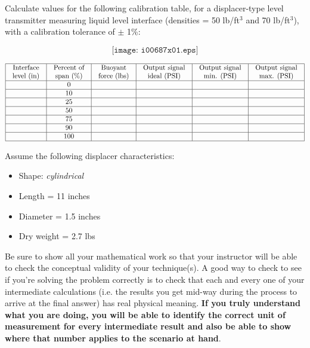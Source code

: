 

Calculate values for the following calibration table, for a displacer-type level transmitter measuring liquid level interface (densities = 50 lb/ft$^{3}$ and 70 lb/ft$^{3}$), with a calibration tolerance of $\pm$ 1\%:

$$\texttt{[image: i00687x01.eps]}$$


$$\vbox{\offinterlineskip
\halign{\strut
\vrule \quad\hfil # \ \hfil & 
\vrule \quad\hfil # \ \hfil & 
\vrule \quad\hfil # \ \hfil & 
\vrule \quad\hfil # \ \hfil & 
\vrule \quad\hfil # \ \hfil & 
\vrule \quad\hfil # \ \hfil \vrule \cr
\noalign{\hrule}
%
Interface & Percent of & Buoyant & Output signal & Output signal & Output signal \cr
%
level (in) & span (\%) & force (lbs) & ideal (PSI) & min. (PSI) & max. (PSI) \cr
%
\noalign{\hrule}
%
  & 0 &  &  &  &  \cr
%
\noalign{\hrule}
%
  & 10 &  &  &  &  \cr
%
\noalign{\hrule}
%
  & 25 &  &  &  &  \cr
%
\noalign{\hrule}
%
  & 50 &  &  &  &  \cr
%
\noalign{\hrule}
%
  & 75 &  &  &  &  \cr
%
\noalign{\hrule}
%
  & 90 &  &  &  &  \cr
%
\noalign{\hrule}
%
  & 100 &  &  &  &  \cr
%
\noalign{\hrule}
} %
}$$ %

Assume the following displacer characteristics:

\begin{itemize}
\item{} Shape: {\it cylindrical}
\item{} Length = 11 inches
\item{} Diameter = 1.5 inches
\item{} Dry weight = 2.7 lbs
\end{itemize}

\vskip 10pt

Be sure to show all your mathematical work so that your instructor will be able to check the conceptual validity of your technique(s).  A good way to check to see if you're solving the problem correctly is to check that each and every one of your intermediate calculations (i.e. the results you get mid-way during the process to arrive at the final answer) has real physical meaning.  {\bf If you truly understand what you are doing, you will be able to identify the correct unit of measurement for every intermediate result and also be able to show where that number applies to the scenario at hand}.


